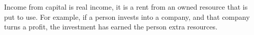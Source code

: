 Income from capital is real income, it is a rent from an owned resource that is put to use. For example, if a person invests into a company, and that company turns a profit, the investment has earned the person extra resources.
